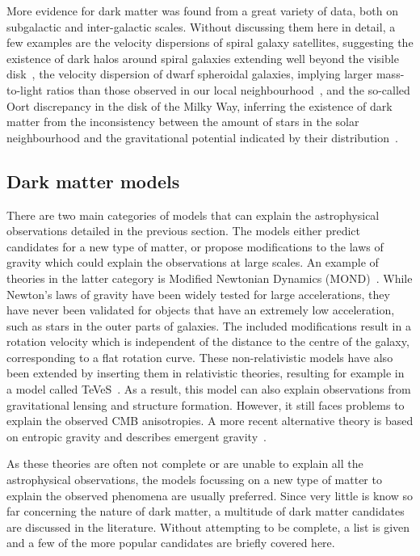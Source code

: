 More evidence for dark matter was found from a great variety of data, both on subgalactic and inter-galactic scales. Without discussing them here in detail, a few examples are the velocity dispersions of spiral galaxy satellites, suggesting the existence of dark halos around spiral galaxies extending well beyond the visible disk~\cite{Azzaro:2003hp}, the velocity dispersion of dwarf spheroidal galaxies, implying larger mass-to-light ratios than those observed in our local neighbourhood~\cite{Mateo:1998wg}, and the so-called Oort discrepancy in the disk of the Milky Way, inferring the existence of dark matter from the inconsistency between the amount of stars in the solar neighbourhood and the gravitational potential indicated by their distribution~\cite{Bahcall:1991qs}.

\subsection{Dark matter models}

There are two main categories of models that can explain the astrophysical observations detailed in the previous section. The models either predict candidates for a new type of matter, or propose modifications to the laws of gravity which could explain the observations at large scales. An example of theories in the latter category is Modified Newtonian Dynamics (MOND)~\cite{Milgrom:1983ca,Milgrom:1983pn,Milgrom:1983zz}. While Newton's laws of gravity have been widely tested for large accelerations, they have never been validated for objects that have an extremely low acceleration, such as stars in the outer parts of galaxies. The included modifications result in a rotation velocity which is independent of the distance to the centre of the galaxy, corresponding to a flat rotation curve. These non-relativistic models have also been extended by inserting them in relativistic theories, resulting for example in a model called TeVeS~\cite{Bekenstein:2004ne}. As a result, this model can also explain observations from gravitational lensing and structure formation. However, it still faces problems to explain the observed \ac{CMB} anisotropies. A more recent alternative theory is based on entropic gravity and describes emergent gravity~\cite{Verlinde:2016toy}.

As these theories are often not complete or are unable to explain all the astrophysical observations, the models focussing on a new type of matter to explain the observed phenomena are usually preferred. Since very little is know so far concerning the nature of dark matter, a multitude of dark matter candidates are discussed in the literature. Without attempting to be complete, a list is given and a few of the more popular candidates are briefly covered here.

